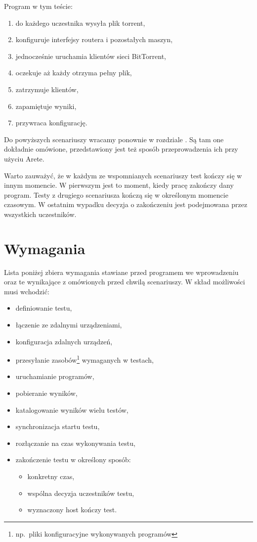 \documentclass[00-praca-magisterska.tex]{subfiles}
\begin{document}
Program w tym teście:
\begin{enumerate}
\item do każdego uczestnika wysyła plik torrent,
\item konfiguruje interfejsy routera i pozostałych maszyn,
\item jednocześnie uruchamia klientów sieci BitTorrent,
\item oczekuje aż każdy otrzyma pełny plik,
\item zatrzymuje klientów,
\item zapamiętuje wyniki,
\item przywraca konfigurację.
\end{enumerate}

Do powyższych scenariuszy wracamy ponownie w rozdziale . Są
tam one dokładnie omówione, przedstawiony jest też sposób przeprowadzenia ich
przy użyciu Arete.

Warto zauważyć, że w każdym ze wspomnianych scenariuszy test kończy się w
innym momencie. W pierwszym jest to moment, kiedy pracę zakończy dany program.
Testy z drugiego scenariusza kończą się w określonym momencie czasowym. W
ostatnim wypadku decyzja o zakończeniu jest podejmowana przez wszystkich
uczestników.

\section{Wymagania}

Lista poniżej zbiera wymagania stawiane przed programem we wprowadzeniu oraz te
wynikające z omówionych przed chwilą scenariuszy. W skład możliwości musi wchodzić:
\begin{itemize}
\item definiowanie testu,
\item łączenie ze zdalnymi urządzeniami,
\item konfiguracja zdalnych urządzeń,
\item przesyłanie zasobów\footnote{np.~pliki konfiguracyjne wykonywanych programów}  wymaganych w testach,
\item uruchamianie programów,
\item pobieranie wyników,
\item katalogowanie wyników wielu testów,
\item synchronizacja startu testu,
\item rozłączanie na czas wykonywania testu,
\item zakończenie testu w określony sposób:
  \begin{itemize}
  \item konkretny czas,
  \item wspólna decyzja uczestników testu,
  \item wyznaczony host kończy test.
  \end{itemize}
\end{itemize}
\end{document}
